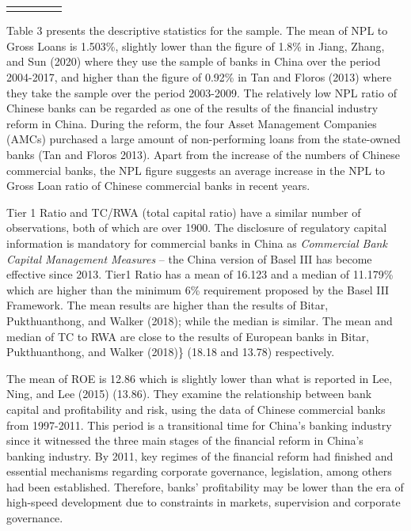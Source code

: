 \documentclass{article}
\begin{document}
\begin{longtable}[c]{|p{1.24in}|p{0.67in}|p{0.75in}|p{0.79in}|p{0.75in}}
\noalign{\global\setlength{\arrayrulewidth}{2pt}}\arrayrulecolor[HTML]{666666}\cline{1-5}

\end{longtable}

Table 3 presents the descriptive statistics for the sample. The mean of
NPL to Gross Loans is 1.503\%, slightly lower than the figure of 1.8\%
in Jiang, Zhang, and Sun (2020) where they use the sample of banks in
China over the period 2004-2017, and higher than the figure of 0.92\% in
Tan and Floros (2013) where they take the sample over the period
2003-2009. The relatively low NPL ratio of Chinese banks can be regarded
as one of the results of the financial industry reform in China. During
the reform, the four Asset Management Companies (AMCs) purchased a large
amount of non-performing loans from the state-owned banks (Tan and
Floros 2013). Apart from the increase of the numbers of Chinese
commercial banks, the NPL figure suggests an average increase in the NPL
to Gross Loan ratio of Chinese commercial banks in recent years.

Tier 1 Ratio and TC/RWA (total capital ratio) have a similar number of
observations, both of which are over 1900. The disclosure of regulatory
capital information is mandatory for commercial banks in China as
\emph{Commercial Bank Capital Management Measures} -- the China version
of Basel III has become effective since 2013. Tier1 Ratio has a mean of
16.123 and a median of 11.179\% which are higher than the minimum 6\%
requirement proposed by the Basel III Framework. The mean results are
higher than the results of Bitar, Pukthuanthong, and Walker (2018);
while the median is similar. The mean and median of TC to RWA are close
to the results of European banks in Bitar, Pukthuanthong, and Walker
(2018)\} (18.18 and 13.78) respectively.

The mean of ROE is 12.86 which is slightly lower than what is reported
in Lee, Ning, and Lee (2015) (13.86). They examine the relationship
between bank capital and profitability and risk, using the data of
Chinese commercial banks from 1997-2011. This period is a transitional
time for China's banking industry since it witnessed the three main
stages of the financial reform in China's banking industry. By 2011, key
regimes of the financial reform had finished and essential mechanisms
regarding corporate governance, legislation, among others had been
established. Therefore, banks' profitability may be lower than the era
of high-speed development due to constraints in markets, supervision and
corporate governance.
\end{document}
